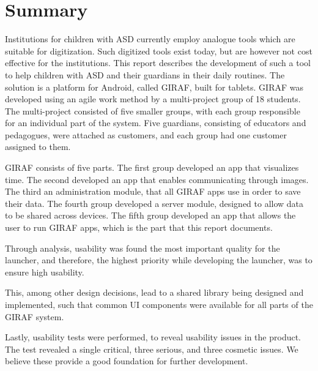
\begingroup
\let\clearpage\relax
\let\cleardoublepage\relax
\let\cleardoublepage\relax

\chapter*{Summary}
\label{report_structure}

Institutions for children with ASD currently employ analogue tools which are suitable for digitization. Such digitized tools exist today, but are however not cost effective for the institutions. 
This report describes the development of such a tool to help children with ASD and their guardians in their daily routines. The solution is a platform for Android, called GIRAF, built for tablets.
GIRAF was developed using an agile work method by a multi-project group of 18 students. The multi-project consisted of five smaller groups, with each group responsible for an individual part of the system. Five guardians, consisting of educators and pedagogues, were attached as customers, and each group had one customer assigned to them.

GIRAF consists of five parts. The first group developed an app that visualizes time. The second developed an app that enables communicating through images. The third an administration module, that all GIRAF apps use in order to save their data.
The fourth group developed a server module, designed to allow data to be shared across devices. The fifth group developed an app that allows the user to run GIRAF apps, which is the part that this report documents.

Through analysis, usability was found the most important quality for the launcher, and therefore, the highest priority while developing the launcher, was to ensure high usability.

This, among other design decisions, lead to a shared library being designed and implemented, such that common UI components were available for all parts of the GIRAF system.

Lastly, usability tests were performed, to reveal usability issues in the product. The test revealed a single critical, three serious, and three cosmetic issues. We believe these provide a good foundation for further development.

\endgroup			
\vfill
